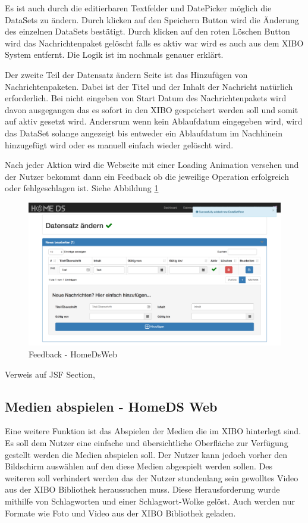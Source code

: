 Es ist auch durch die editierbaren Textfelder und DatePicker möglich die DataSets zu ändern. Durch klicken auf den Speichern Button wird die Änderung des einzelnen DataSets bestätigt. Durch klicken auf den roten Löschen Button wird das Nachrichtenpaket gelöscht falls es aktiv war wird es auch aus dem XIBO System entfernt. Die Logik ist im \pageref{sec:datasetexpiredate} nochmals genauer erklärt. 

Der zweite Teil der Datensatz ändern Seite ist das Hinzufügen von Nachrichtenpaketen. Dabei ist der Titel und der Inhalt der Nachricht natürlich erforderlich. Bei nicht eingeben von Start Datum des Nachrichtenpakets wird davon ausgegangen das es sofort in den XIBO gespeichert werden soll und somit auf aktiv gesetzt wird. Andersrum wenn kein Ablaufdatum eingegeben wird, wird das DataSet solange angezeigt bis entweder ein Ablaufdatum im Nachhinein hinzugefügt wird oder es manuell einfach wieder gelöscht wird.

Nach jeder Aktion wird die Webseite mit einer Loading Animation versehen und der Nutzer bekommt dann ein Feedback ob die jeweilige Operation erfolgreich oder fehlgeschlagen ist. Siehe Abbildung \ref{img:feedback}

\begin{figure}[h]
\centering
\includegraphics[width=1\textwidth]{images/08_HomeDsWeb/Message.png}
\caption{Feedback - HomeDsWeb}
\label{img:feedback}
\end{figure}


Verweis auf JSF Section,


\subsection{Medien abspielen - HomeDS Web}\label{sec:playmedia}
Eine weitere Funktion ist das Abspielen der Medien die im XIBO hinterlegt sind. Es soll dem Nutzer eine einfache und übersichtliche Oberfläche zur Verfügung gestellt werden die Medien abspielen soll. Der Nutzer kann jedoch vorher den Bildschirm auswählen auf den diese Medien abgespielt werden sollen. Des weiteren soll verhindert werden das der Nutzer stundenlang sein gewolltes Video aus der XIBO Bibliothek heraussuchen muss. Diese Herausforderung wurde mithilfe von Schlagworten und einer Schlagwort-Wolke gelöst. Auch werden nur Formate wie Foto und Video aus der XIBO Bibliothek geladen.

